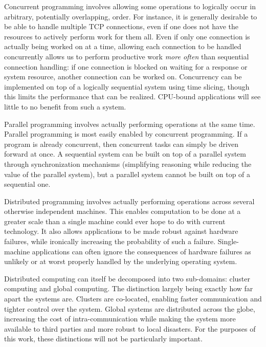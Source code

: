 \documentclass[10pt,a4paper,twocolumn]{article}
\begin{document}
Concurrent programming involves allowing some operations to logically occur in
arbitrary, potentially overlapping, order. For instance, it is generally
desirable to be able to handle multiple TCP connections, even if one does not
have the resources to actively perform work for them all. Even if only one
connection is actually being worked on at a time, allowing each connection to be
handled concurrently allows us to perform productive work \emph{more often} than
sequential connection handling: if one connection is blocked on waiting for a
response or system resource, another connection can be worked on. Concurrency
can be implemented on top of a logically sequential system using time slicing,
though this limits the performance that can be realized. CPU-bound applications
will see little to no benefit from such a system.

Parallel programming involves actually performing operations at the same time.
Parallel programming is most easily enabled by concurrent programming. If a
program is already concurrent, then concurrent tasks can simply be driven
forward at once. A sequential system can be built on top of a parallel system
through synchronization mechanisms (simplifying reasoning while reducing the
value of the parallel system), but a parallel system cannot be built on top of a
sequential one.

Distributed programming involves actually performing operations across several
otherwise independent machines. This enables computation to be done at a greater
scale than a single machine could ever hope to do with current technology. It
also allows applications to be made robust against hardware failures, while
ironically increasing the probability of such a failure. Single-machine
applications can often ignore the consequences of hardware failures as unlikely
or at worst properly handled by the underlying operating system. 

Distributed computing can itself be decomposed into two sub-domains: cluster
computing and global computing. The distinction largely being exactly how far
apart the systems are. Clusters are co-located, enabling faster communication
and tighter control over the system. Global systems are distributed across the
globe, increasing the cost of intra-communication while making the system more
available to third parties and more robust to local disasters. For the purposes
of this work, these distinctions will not be particularly important.
\end{document}
